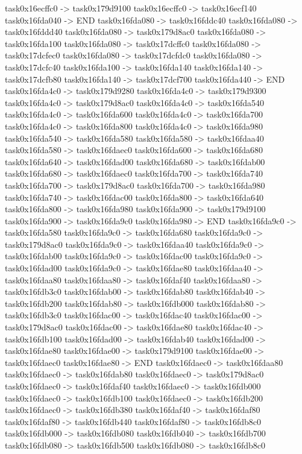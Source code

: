 {	task0x16ecffc0 -> task0x179d9100
	task0x16ecffc0 -> task0x16ecf140
	task0x16fda040 -> END
	task0x16fda080 -> task0x16fddc40
	task0x16fda080 -> task0x16fddd40
	task0x16fda080 -> task0x179d8ac0
	task0x16fda080 -> task0x16fda100
	task0x16fda080 -> task0x17dcffc0
	task0x16fda080 -> task0x17dcfec0
	task0x16fda080 -> task0x17dcfdc0
	task0x16fda080 -> task0x17dcfc40
	task0x16fda100 -> task0x16fda140
	task0x16fda140 -> task0x17dcfb80
	task0x16fda140 -> task0x17dcf700
	task0x16fda440 -> END
	task0x16fda4c0 -> task0x179d9280
	task0x16fda4c0 -> task0x179d9300
	task0x16fda4c0 -> task0x179d8ac0
	task0x16fda4c0 -> task0x16fda540
	task0x16fda4c0 -> task0x16fda600
	task0x16fda4c0 -> task0x16fda700
	task0x16fda4c0 -> task0x16fda800
	task0x16fda4c0 -> task0x16fda980
	task0x16fda540 -> task0x16fda580
	task0x16fda580 -> task0x16fdaa40
	task0x16fda580 -> task0x16fdaec0
	task0x16fda600 -> task0x16fda680
	task0x16fda640 -> task0x16fdad00
	task0x16fda680 -> task0x16fdab00
	task0x16fda680 -> task0x16fdaec0
	task0x16fda700 -> task0x16fda740
	task0x16fda700 -> task0x179d8ac0
	task0x16fda700 -> task0x16fda980
	task0x16fda740 -> task0x16fdac00
	task0x16fda800 -> task0x16fda640
	task0x16fda800 -> task0x16fda980
	task0x16fda900 -> task0x179d9100
	task0x16fda900 -> task0x16fda9c0
	task0x16fda980 -> END
	task0x16fda9c0 -> task0x16fda580
	task0x16fda9c0 -> task0x16fda680
	task0x16fda9c0 -> task0x179d8ac0
	task0x16fda9c0 -> task0x16fdaa40
	task0x16fda9c0 -> task0x16fdab00
	task0x16fda9c0 -> task0x16fdac00
	task0x16fda9c0 -> task0x16fdad00
	task0x16fda9c0 -> task0x16fdae80
	task0x16fdaa40 -> task0x16fdaa80
	task0x16fdaa80 -> task0x16fdaf40
	task0x16fdaa80 -> task0x16fdb3c0
	task0x16fdab00 -> task0x16fdab80
	task0x16fdab40 -> task0x16fdb200
	task0x16fdab80 -> task0x16fdb000
	task0x16fdab80 -> task0x16fdb3c0
	task0x16fdac00 -> task0x16fdac40
	task0x16fdac00 -> task0x179d8ac0
	task0x16fdac00 -> task0x16fdae80
	task0x16fdac40 -> task0x16fdb100
	task0x16fdad00 -> task0x16fdab40
	task0x16fdad00 -> task0x16fdae80
	task0x16fdae00 -> task0x179d9100
	task0x16fdae00 -> task0x16fdaec0
	task0x16fdae80 -> END
	task0x16fdaec0 -> task0x16fdaa80
	task0x16fdaec0 -> task0x16fdab80
	task0x16fdaec0 -> task0x179d8ac0
	task0x16fdaec0 -> task0x16fdaf40
	task0x16fdaec0 -> task0x16fdb000
	task0x16fdaec0 -> task0x16fdb100
	task0x16fdaec0 -> task0x16fdb200
	task0x16fdaec0 -> task0x16fdb380
	task0x16fdaf40 -> task0x16fdaf80
	task0x16fdaf80 -> task0x16fdb440
	task0x16fdaf80 -> task0x16fdb8c0
	task0x16fdb000 -> task0x16fdb080
	task0x16fdb040 -> task0x16fdb700
	task0x16fdb080 -> task0x16fdb500
	task0x16fdb080 -> task0x16fdb8c0
}
